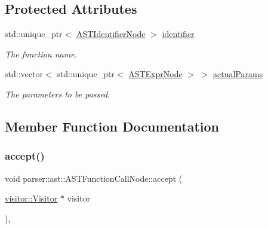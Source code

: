 \subsection*{Protected Attributes}
\begin{DoxyCompactItemize}
\item 
\mbox{\label{classparser_1_1ast_1_1ASTFunctionCallNode_a77b1b97d1a948b8f48e2b67ccedda22b}} 
std\+::unique\+\_\+ptr$<$ \hyperlink{classparser_1_1ast_1_1ASTIdentifierNode}{A\+S\+T\+Identifier\+Node} $>$ \hyperlink{classparser_1_1ast_1_1ASTFunctionCallNode_a77b1b97d1a948b8f48e2b67ccedda22b}{identifier}
\begin{DoxyCompactList}\small\item\em The function name. \end{DoxyCompactList}\item 
\mbox{\label{classparser_1_1ast_1_1ASTFunctionCallNode_abb9d7f3a34dc376b885b321dc0cef0d3}} 
std\+::vector$<$ std\+::unique\+\_\+ptr$<$ \hyperlink{classparser_1_1ast_1_1ASTExprNode}{A\+S\+T\+Expr\+Node} $>$ $>$ \hyperlink{classparser_1_1ast_1_1ASTFunctionCallNode_abb9d7f3a34dc376b885b321dc0cef0d3}{actual\+Params}
\begin{DoxyCompactList}\small\item\em The parameters to be passed. \end{DoxyCompactList}\end{DoxyCompactItemize}


\subsection{Member Function Documentation}
\mbox{\label{classparser_1_1ast_1_1ASTFunctionCallNode_ad7ff48d8398744b1211a6da0399a197b}} 
\subsubsection{\texorpdfstring{accept()}{accept()}}
{\footnotesize\ttfamily void parser\+::ast\+::\+A\+S\+T\+Function\+Call\+Node\+::accept (\begin{DoxyParamCaption}\item[{\hyperlink{classvisitor_1_1Visitor}{visitor\+::\+Visitor} $\ast$}]{visitor }\end{DoxyParamCaption})\hspace{0.3cm}{\ttfamily [override]}, {\ttfamily [virtual]}}

